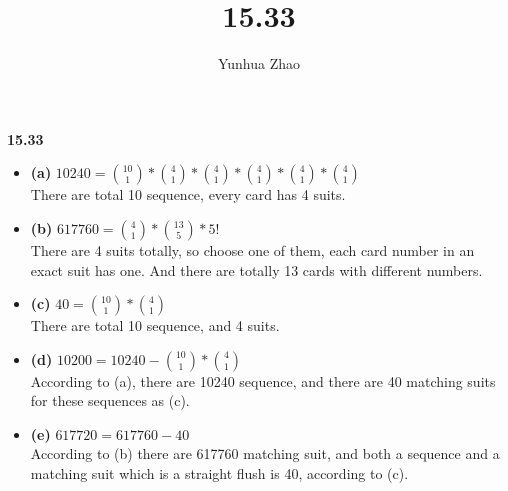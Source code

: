 \documentclass{report}
\author{Yunhua Zhao}
\title{15.33}
\begin{document}
\textbf{15.33}
\begin{itemize}
	\item \textbf{(a)} $10240 = {10 \choose 1}*{4 \choose 1}*{4 \choose 1}*{4 \choose 1}*{4 \choose 1}*{4 \choose 1}$ \\
	There are total 10 sequence, every card has 4 suits.
	\item \textbf{(b)} $617760 = {4 \choose 1}*{13 \choose 5}*5!$  \\
	There are 4 suits totally, so choose one of them, each card number in an exact suit has one. And there are totally 13 cards with different numbers.
	\item \textbf{(c)} $40={10 \choose 1}*{4 \choose 1}$  \\
	There are total 10 sequence, and 4 suits.
	\item \textbf{(d)} $10200 = 10240-{10 \choose 1}*{4 \choose 1}$  \\
	According to (a), there are 10240 sequence, and there are 40 matching suits for these sequences as (c).
	\item \textbf{(e)} $617720 = 617760-40$  \\
	According to (b) there are 617760 matching suit, and both a sequence and a matching suit which is a straight flush is 40, according to (c).
\end{itemize}
\end{document}
